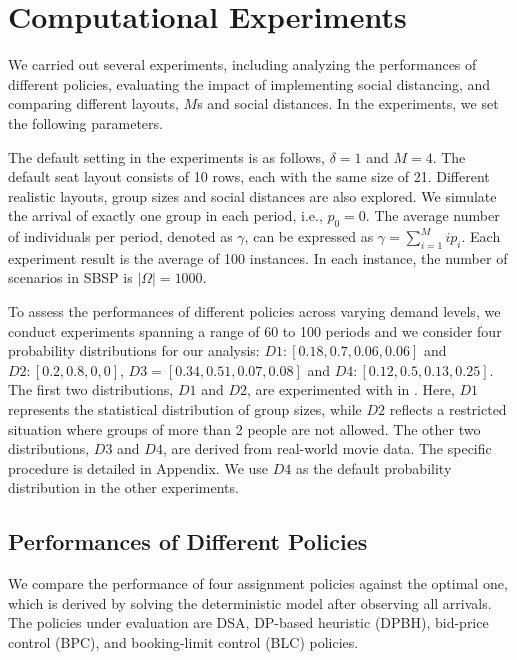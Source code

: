 \section{Computational Experiments}\label{sec_result}
We carried out several experiments, including analyzing the performances of different policies, evaluating the impact of implementing social distancing, and comparing different layouts, $M$s and social distances. In the experiments, we set the following parameters. 

The default setting in the experiments is as follows, $\delta =1$ and $M =4$. The default seat layout consists of 10 rows, each with the same size of 21. Different realistic layouts, group sizes and social distances are also explored. We simulate the arrival of exactly one group in each period, i.e., $p_0 = 0$. The average number of individuals per period, denoted as $\gamma$, can be expressed as $\gamma = \sum_{i=1}^{M} i p_i$. Each experiment result is the average of 100 instances. In each instance, the number of scenarios in SBSP is $|\Omega| = 1000$.

To assess the performances of different policies across varying demand levels, we conduct experiments spanning a range of 60 to 100 periods and we consider four probability distributions for our analysis: $D1:[0.18,0.7,0.06,0.06]$ and $D2:[0.2,0.8,0,0]$, $D3 = [0.34, 0.51, 0.07, 0.08]$ and $D4: [0.12, 0.5, 0.13, 0.25]$. The first two distributions, $D1$ and $D2$, are experimented with in \cite{blom2022filling}. Here, $D1$ represents the statistical distribution of group sizes, while $D2$ reflects a restricted situation where groups of more than 2 people are not allowed. The other two distributions, $D3$ and $D4$, are derived from real-world movie data. The specific procedure is detailed in Appendix. We use $D4$ as the default probability distribution in the other experiments.


\subsection{Performances of Different Policies}
We compare the performance of four assignment policies against the optimal one, which is derived by solving the deterministic model after observing all arrivals. The policies under evaluation are DSA, DP-based heuristic (DPBH), bid-price control (BPC), and booking-limit control (BLC) policies.

